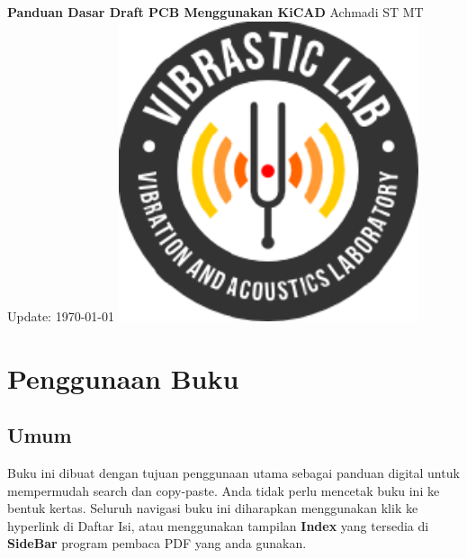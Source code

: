 \documentclass[12pt]{book}
\date{}
\begin{document}
	\frontmatter
	\begin{titlepage}
		\centering
		{\LARGE \bf Panduan Dasar Draft PCB Menggunakan KiCAD}
		\vfill
		{\Large Achmadi ST MT}
		\vfill
		Update: {\today}
		\vfill
		\includegraphics[width=250pt]{images/logo/logoviblab}
		\vfill
		\vfill
		\vfill
	\end{titlepage}


	\newpage
	\tableofcontents
	\listoffigures
	\listoftables



	\newpage
	\chapter{Penggunaan Buku}

	\section{Umum}
	Buku ini dibuat dengan tujuan penggunaan utama sebagai panduan digital untuk mempermudah search dan copy-paste.
	Anda tidak perlu mencetak buku ini ke bentuk kertas.
	Seluruh navigasi buku ini diharapkan menggunakan klik ke hyperlink di Daftar Isi,
	atau menggunakan tampilan \textbf{Index} yang tersedia di \textbf{SideBar} program pembaca PDF yang anda gunakan.
\end{document}
